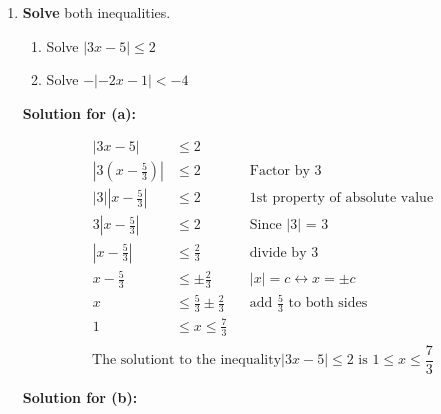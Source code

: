 \documentclass[12pt]{book}
\begin{document}
\begin{enumerate}

\newpage

\item \textbf{Solve} both inequalities.

\begin{enumerate}
\item Solve $|3x-5| \le 2$
\item Solve $-|-2x-1| < -4$
\end{enumerate}

\vspace{0.3cm} 
\textbf{Solution for (a):}
\vspace{0.3cm} 

\addtolength{\jot}{1em}
\begin{align*}
    |3x-5| & \le 2 \\
    |3(x - \frac{5}{3})| & \le 2 && \text{Factor by 3}\\
    |3||x - \frac{5}{3}| & \le 2 && \text{1st property of absolute value}\\
    3|x - \frac{5}{3}| & \le 2 && \text{Since |3| = 3}\\
    |x - \frac{5}{3}| & \le \frac{2}{3} &&  \text{divide by 3}\\
    x - \frac{5}{3} & \le \pm \frac{2}{3} && |x| = c \longleftrightarrow x = \pm c\\
    x & \le \frac{5}{3} \pm \frac{2}{3} && \text{add $\frac{5}{3}$ to both sides}\\
    1 & \le x \le \frac{7}{3}\\
\end{align*}
$$ \text{The solutiont to the inequality} |3x-5| \le 2 \text{ is } \boxed{1 \le x \le \frac{7}{3}} $$

\clearpage
\vspace{0.3cm} 
\textbf{Solution for (b):}
\vspace{0.3cm} 


\end{enumerate}
\end{document}
